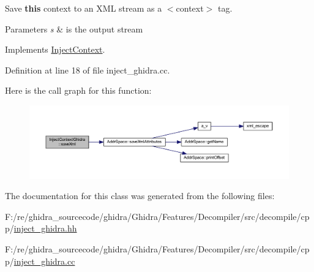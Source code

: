 Save {\bfseries{this}} context to an X\+ML stream as a $<$context$>$ tag. 


\begin{DoxyParams}{Parameters}
{\em s} & is the output stream \\
\hline
\end{DoxyParams}


Implements \mbox{\hyperlink{class_inject_context_a85884d6d9e18996f0b03aa10a4e11be6}{Inject\+Context}}.



Definition at line 18 of file inject\+\_\+ghidra.\+cc.

Here is the call graph for this function\+:
\nopagebreak
\begin{figure}[H]
\begin{center}
\leavevmode
\includegraphics[width=350pt]{class_inject_context_ghidra_a32151798bd5739d2afecf9f0824de4e8_cgraph}
\end{center}
\end{figure}


The documentation for this class was generated from the following files\+:\begin{DoxyCompactItemize}
\item 
F\+:/re/ghidra\+\_\+sourcecode/ghidra/\+Ghidra/\+Features/\+Decompiler/src/decompile/cpp/\mbox{\hyperlink{inject__ghidra_8hh}{inject\+\_\+ghidra.\+hh}}\item 
F\+:/re/ghidra\+\_\+sourcecode/ghidra/\+Ghidra/\+Features/\+Decompiler/src/decompile/cpp/\mbox{\hyperlink{inject__ghidra_8cc}{inject\+\_\+ghidra.\+cc}}\end{DoxyCompactItemize}
